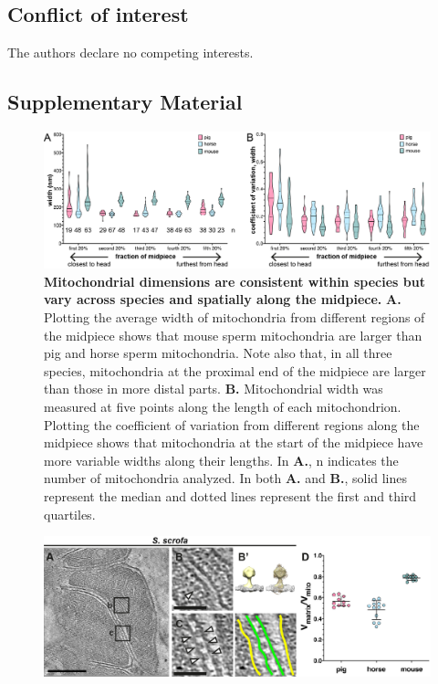 \subsection*{Conflict of interest}
The authors declare no competing interests.
\clearpage
\begin{subappendices}
    \makeatletter\renewcommand{\thetable}{\thechapter.A.\@arabic\c@table}
    \makeatother
    \section{Supplementary Material}
    \begin{figure}[hbt]
        \center
        \includegraphics[]{Chapter.4/Figures/SI_Figure1.png}
        \caption{\textbf{Mitochondrial dimensions are consistent within species but vary across species and spatially along the midpiece.} \textbf{A.} Plotting the average width of mitochondria from different regions of the midpiece shows that mouse sperm mitochondria are larger than pig and horse sperm mitochondria. Note also that, in all three species, mitochondria at the proximal end of the midpiece are larger than those in more distal parts. \textbf{B.} Mitochondrial width was measured at five points along the length of each mitochondrion. Plotting the coefficient of variation from different regions along the midpiece shows that mitochondria at the start of the midpiece have more variable widths along their lengths. In \textbf{A.}, n indicates the number of mitochondria analyzed. In both \textbf{A.} and \textbf{B.}, solid lines represent the median and dotted lines represent the first and third quartiles.}
        \label{fig:ch4_app_fig1}
    \end{figure}
    \begin{figure}[hbt]
        \center
        \includegraphics[]{Chapter.4/Figures/SI_Figure2.png}

\end{figure}
\end{subappendices}
